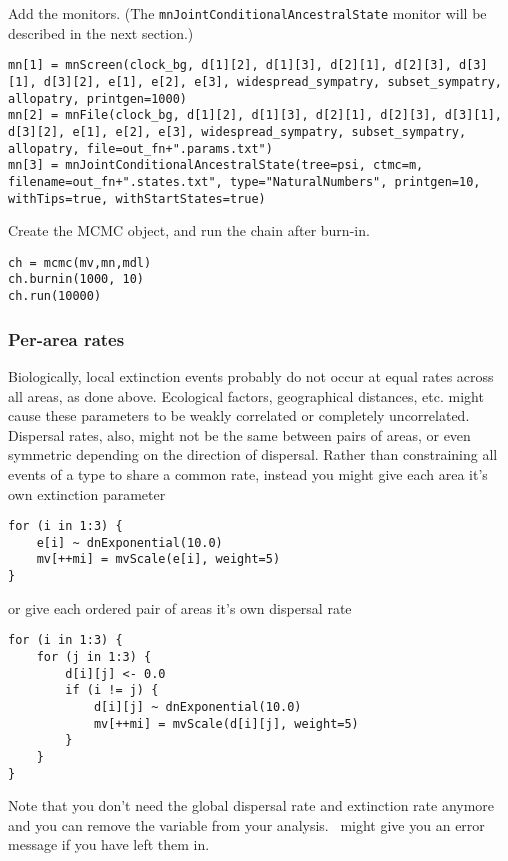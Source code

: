Add the monitors. (The {\tt mnJointConditionalAncestralState} monitor will be described in the next section.)

\begin{snugshade}
\begin{lstlisting}
mn[1] = mnScreen(clock_bg, d[1][2], d[1][3], d[2][1], d[2][3], d[3][1], d[3][2], e[1], e[2], e[3], widespread_sympatry, subset_sympatry, allopatry, printgen=1000)
mn[2] = mnFile(clock_bg, d[1][2], d[1][3], d[2][1], d[2][3], d[3][1], d[3][2], e[1], e[2], e[3], widespread_sympatry, subset_sympatry, allopatry, file=out_fn+".params.txt")
mn[3] = mnJointConditionalAncestralState(tree=psi, ctmc=m, filename=out_fn+".states.txt", type="NaturalNumbers", printgen=10, withTips=true, withStartStates=true)
\end{lstlisting}
\end{snugshade}

Create the MCMC object, and run the chain after burn-in.
\begin{snugshade}
\begin{lstlisting}
ch = mcmc(mv,mn,mdl)
ch.burnin(1000, 10)
ch.run(10000)
\end{lstlisting}
\end{snugshade}

\subsubsection{Per-area rates}

Biologically, local extinction events probably do not occur at equal rates across all areas, as done above.
Ecological factors, geographical distances, etc. might cause these parameters to be weakly correlated or completely uncorrelated.
Dispersal rates, also, might not be the same between pairs of areas, or even symmetric depending on the direction of dispersal.
Rather than constraining all events of a type to share a common rate, instead you might give each area it's own extinction parameter

\begin{snugshade}
\begin{lstlisting}
for (i in 1:3) {
    e[i] ~ dnExponential(10.0)
    mv[++mi] = mvScale(e[i], weight=5)
}
\end{lstlisting}
\end{snugshade}

or give each ordered pair of areas it's own dispersal rate

\begin{snugshade}
\begin{lstlisting}
for (i in 1:3) {
    for (j in 1:3) {
    	d[i][j] <- 0.0
        if (i != j) {
            d[i][j] ~ dnExponential(10.0)
            mv[++mi] = mvScale(d[i][j], weight=5)
        }
    }
}
\end{lstlisting}
\end{snugshade}
Note that you don't need the global dispersal rate  and extinction rate  anymore and you can remove the variable from your analysis. \RevBayes~might give you an error message if you have left them in.

